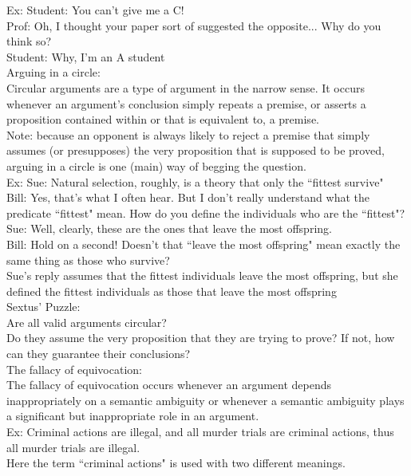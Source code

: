 Ex: Student: You can't give me a C!\\
Prof: Oh, I thought your paper sort of suggested the opposite... Why do you think so?\\
Student: Why, I'm an A student\\

Arguing in a circle:\\
Circular arguments are a type of argument in the narrow sense. It occurs whenever an argument's conclusion simply repeats a premise, or asserts a proposition contained within or that is equivalent to, a premise.\\
Note: because an opponent is always likely to reject a premise that simply assumes (or presupposes) the very proposition that is supposed to be proved, arguing in a circle is one (main) way of begging the question.\\

Ex: Sue: Natural selection, roughly, is a theory that only the ``fittest survive"\\
Bill: Yes, that's what I often hear. But I don't really understand what the predicate ``fittest" mean. How do you define the individuals who are the ``fittest"?\\
Sue: Well, clearly, these are the ones that leave the most offspring.\\
Bill: Hold on a second! Doesn't that ``leave the most offspring" mean exactly the same thing as those who survive?\\
Sue's reply assumes that the fittest individuals leave the most offspring, but she defined the fittest individuals as those that leave the most offspring\\

Sextus' Puzzle:\\
Are all valid arguments circular?\\
Do they assume the very proposition that they are trying to prove? If not, how can they guarantee their conclusions?\\

The fallacy of equivocation:\\
The fallacy of equivocation occurs whenever an argument depends inappropriately on a semantic ambiguity or whenever a semantic ambiguity plays a significant but inappropriate role in an argument.\\

Ex: Criminal actions are illegal, and all murder trials are criminal actions, thus all murder trials are illegal.\\
Here the term ``criminal actions" is used with two different meanings.\\


